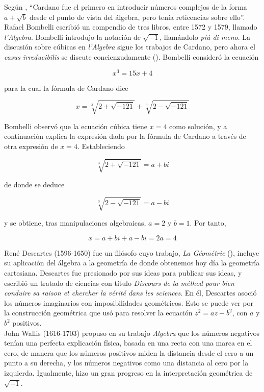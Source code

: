 \documentclass[../main.tex]{memoir}
\begin{document}
Según \cite{waerden1985}, ``Cardano fue el primero en introducir números complejos de la forma $a + \sqrt{b}$ desde el punto de vista del álgebra, pero tenía reticencias sobre ello''.\\

Rafael Bombelli escribió un compendio de tres libros, entre 1572 y 1579, llamado \textit{l'Algebra}. Bombelli introdujo la notación de $\sqrt{-1}$, llamándolo \textit{piú di meno}. La discusión sobre cúbicas en \textit{l'Algebra} sigue los trabajos de Cardano, pero ahora el \textit{casus irreducibilis} se discute concienzudamente (\cite{blank1999}). Bombelli consideró la ecuación

$$ x^3 = 15x+4$$

para la cual la fórmula de Cardano dice

$$ x = \sqrt[3]{2+\sqrt{-121}} + \sqrt[3]{2-\sqrt{-121}}$$

Bombelli observó que la ecuación cúbica tiene $x = 4$ como solución, y a continuación explica la expresión dada por la fórmula de Cardano a través de otra expresión de $x = 4$. Estableciendo

$$ \sqrt[3]{2+\sqrt{-121}} = a +bi$$

de donde se deduce

$$ \sqrt[3]{2-\sqrt{-121}} = a-bi$$

y se obtiene, tras manipulaciones algebraicas, $a=2$ y $b=1$. Por tanto,

$$x = a+bi +a -bi = 2a = 4$$

René Descartes (1596-1650) fue un filósofo cuyo trabajo, \textit{La Géométrie} (\cite{descartes1952}), incluye su aplicación del álgebra a la geometría de donde obtenemos hoy día la geometría cartesiana. Descartes fue presionado por sus ideas para publicar sus ideas, y escribió un tratado de ciencias con título \textit{Discours de la méthod pour bien conduire sa raison et chercher la vérité dans les sciences}. En él, Descartes asoció los números imaginarios con imposibilidades geométricos. Esto se puede ver por la construcción geométrica que usó para resolver la ecuación $z^2 =az-b^2$, con $a$ y $b^2$ positivos. \\

John Wallis (1616-1703) propuso en su trabajo \textit{Algebra} que los números negativos tenían una perfecta explicación física, basada en una recta con una marca en el cero, de manera que los números positivos miden la distancia desde el cero a un punto a su derecha, y los números negativos como una distancia al cero por la izquierda. Igualmente, hizo un gran progreso en la interpretación geométrica de $\sqrt{-1}$.  \\
\end{document}
